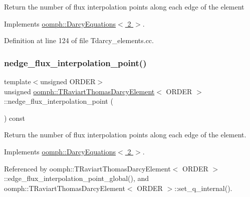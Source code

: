 Return the number of flux interpolation points along each edge of the element 

Implements \hyperlink{classoomph_1_1DarcyEquations_a4e09bc2cc0d08dc6dd43580c2a45d5c4}{oomph\+::\+Darcy\+Equations$<$ 2 $>$}.



Definition at line 124 of file Tdarcy\+\_\+elements.\+cc.

\mbox{\label{classoomph_1_1TRaviartThomasDarcyElement_aee9de4e429ee7852f960a9cf80bfe4fc}} 
\subsubsection{\texorpdfstring{nedge\+\_\+flux\+\_\+interpolation\+\_\+point()}{nedge\_flux\_interpolation\_point()}\hspace{0.1cm}{\footnotesize\ttfamily [2/3]}}
{\footnotesize\ttfamily template$<$unsigned O\+R\+D\+ER$>$ \\
unsigned \hyperlink{classoomph_1_1TRaviartThomasDarcyElement}{oomph\+::\+T\+Raviart\+Thomas\+Darcy\+Element}$<$ O\+R\+D\+ER $>$\+::nedge\+\_\+flux\+\_\+interpolation\+\_\+point (\begin{DoxyParamCaption}{ }\end{DoxyParamCaption}) const\hspace{0.3cm}{\ttfamily [virtual]}}



Return the number of flux interpolation points along each edge of the element. 



Implements \hyperlink{classoomph_1_1DarcyEquations_a4e09bc2cc0d08dc6dd43580c2a45d5c4}{oomph\+::\+Darcy\+Equations$<$ 2 $>$}.



Referenced by oomph\+::\+T\+Raviart\+Thomas\+Darcy\+Element$<$ O\+R\+D\+E\+R $>$\+::edge\+\_\+flux\+\_\+interpolation\+\_\+point\+\_\+global(), and oomph\+::\+T\+Raviart\+Thomas\+Darcy\+Element$<$ O\+R\+D\+E\+R $>$\+::set\+\_\+q\+\_\+internal().

\mbox{\label{classoomph_1_1TRaviartThomasDarcyElement_a0dfc4273d662f5e70284c4cedb2f9b7b}} 

